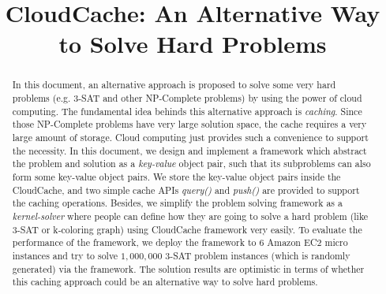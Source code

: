 \documentclass[10pt,conference]{cls/IEEEtran}
\begin{document}
%
\title{CloudCache: An Alternative Way to Solve Hard Problems}

\author{
}

\maketitle


\begin{abstract}
In this document, an alternative approach is proposed to solve some very hard problems (e.g. 3-SAT and other NP-Complete problems) by using the power of cloud computing. The fundamental idea behinds this alternative approach is \emph{caching}. Since those NP-Complete problems have very large solution space, the cache requires a very large amount of storage. Cloud computing just provides such a convenience to support the necessity. In this document, we design and implement a framework which abstract the problem and solution as a \emph{key-value} object pair, such that its subproblems can also form some key-value object pairs. We store the key-value object pairs inside the CloudCache, and two simple cache APIs \emph{query()} and \emph{push()} are provided to support the caching operations. Besides, we simplify the problem solving framework as a \emph{kernel-solver} where people can define how they are going to solve a hard problem (like 3-SAT or k-coloring graph) using CloudCache framework very easily. To evaluate the performance of the framework, we deploy the framework to $6$ Amazon EC2 micro instances and try to solve $1,000,000$ 3-SAT problem instances (which is randomly generated) via the framework. The solution results are optimistic in terms of whether this caching approach could be an alternative way to solve hard problems.
\end{abstract}


\IEEEpeerreviewmaketitle











%
%


\end{document}
